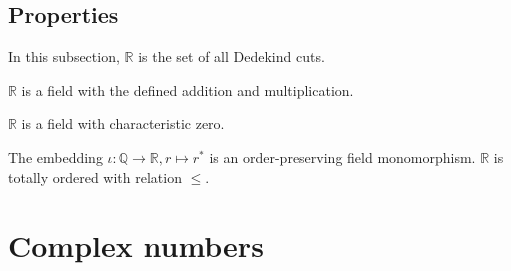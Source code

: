 \documentclass[class=mike-apostol-mathematical-analysis,crop=false]{standalone}
\begin{document}
\subsection*{Properties}

\par In this subsection, $\mathbb{R}$ is the set of all Dedekind cuts.

\begin{theorem}
    $\mathbb{R}$ is a field with the defined addition and multiplication.
\end{theorem}

\begin{theorem}
    $\mathbb{R}$ is a field with characteristic zero.
\end{theorem}

\begin{theorem}
    The embedding $\iota: \mathbb{Q} \to \mathbb{R}, r \mapsto {r}^{*}$ is an order-preserving field monomorphism.
    $\mathbb{R}$ is totally ordered with relation $\leq$.
\end{theorem}

\section{Complex numbers}
\end{document}

